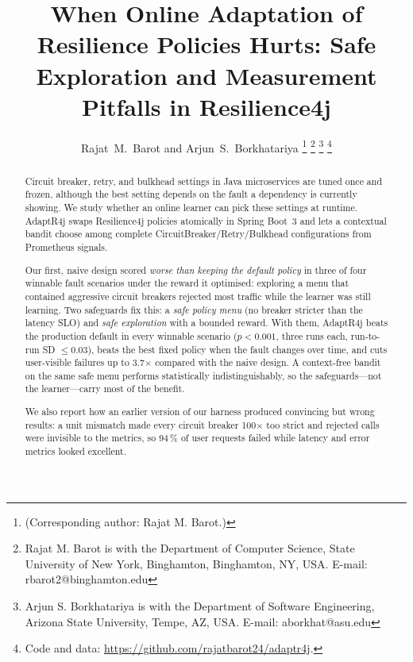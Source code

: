 \documentclass[journal]{IEEEtran}
\newcommand{\adaptr}{AdaptR4j\xspace}
\newcommand{\rFJ}{Resilience4j\xspace}
\begin{document}
\title{When Online Adaptation of Resilience Policies Hurts: Safe Exploration and Measurement Pitfalls in Resilience4j}

\author{Rajat~M.~Barot and Arjun~S.~Borkhatariya%
\thanks{(Corresponding author: Rajat M. Barot.)}%
\thanks{Rajat M. Barot is with the Department of Computer Science, State University of New York,
Binghamton, Binghamton, NY, USA. E-mail: rbarot2@binghamton.edu}%
\thanks{Arjun S. Borkhatariya is with the Department of Software Engineering, Arizona State
University, Tempe, AZ, USA. E-mail: aborkhat@asu.edu}%
\thanks{Code and data: \url{https://github.com/rajatbarot24/adaptr4j}.}}


\maketitle

\begin{abstract}
Circuit breaker, retry, and bulkhead settings in Java microservices are tuned once and frozen,
although the best setting depends on the fault a dependency is currently showing. We study
whether an online learner can pick these settings at runtime. \adaptr swaps \rFJ policies
atomically in Spring Boot~3 and lets a contextual bandit choose among complete
CircuitBreaker/Retry/Bulkhead configurations from Prometheus signals.

Our first, naive design scored \emph{worse than keeping the default policy} in three of four
winnable fault scenarios under the reward it optimised: exploring a menu that contained aggressive circuit breakers rejected
most traffic while the learner was still learning. Two safeguards fix this: a \emph{safe policy
menu} (no breaker stricter than the latency SLO) and \emph{safe exploration} with a bounded
reward. With them, \adaptr beats the production default in every winnable scenario
($p<0.001$, three runs each, run-to-run SD $\le 0.03$), beats the best fixed policy when the
fault changes over time, and cuts user-visible failures up to 3.7$\times$ compared with the
naive design. A context-free bandit on the same safe menu performs statistically
indistinguishably, so the safeguards---not the learner---carry most of the benefit.

We also report how an earlier version of our harness produced convincing but wrong results:
a unit mismatch made every circuit breaker 100$\times$ too strict and rejected calls were
invisible to the metrics, so 94\,\% of user requests failed while latency and error metrics
looked excellent.
\end{abstract}
\end{document}
